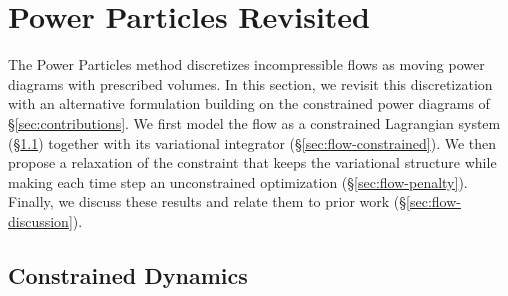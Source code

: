 \documentclass[main.tex]{subfiles}
\begin{document}
\section{Power Particles Revisited}
\label{sec:flow}

The Power Particles method \cite{deGoes2015PowerParticles} discretizes incompressible flows as moving power diagrams with prescribed volumes.
In this section, we revisit this discretization with an alternative formulation building on the constrained power diagrams of \S\ref{sec:contributions}.
We first model the flow as a constrained Lagrangian system (\S\ref{sec:flow-dynamics}) together with its variational integrator (\S\ref{sec:flow-constrained}).
We then propose a relaxation of the constraint that keeps the variational structure while making each time step an unconstrained optimization (\S\ref{sec:flow-penalty}).
Finally, we discuss these results and relate them to prior work (\S\ref{sec:flow-discussion}).

\subsection{Constrained Dynamics}
\label{sec:flow-dynamics}
\end{document}
